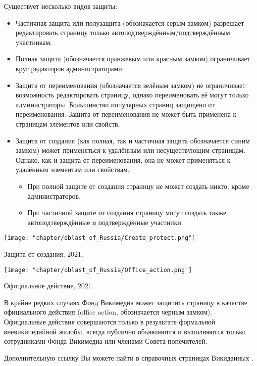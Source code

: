 Существует несколько видов защиты:
\begin{itemize}
  \item Частичная защита или полузащита (обозначается серым замком) разрешает редактировать страницу только автоподтверждённым/подтверждённым участникам.
  \item Полная защита (обозначается оранжевым или красным замком) ограничивает круг редакторов администраторами.
  \item Защита от переименования (обозначается зелёным замком) не ограничивает возможность редактировать страницу, однако переименовать её могут только администраторы. Большинство популярных страниц защищено от переименования. Защита от переименования не может быть применена к страницам элементов или свойств.
  \item Защита от создания (как полная, так и частичная защита обозначается синим замком) может применяться к удалённым или несуществующим страницам. Однако, как и защита от переименования, она не может применяться к удалённым элементам или свойствам.
  \begin{itemize}
	\item При полной защите от создания страницу не может создать никто, кроме администраторов.
	\item При частичной защите от создания страницу могут создать также автоподтверждённые и подтверждённые участники.
  \end{itemize}
\end{itemize}

\begin{marginfigure}[0.0cm]
{
	\setlength{\fboxsep}{0pt}%
	\setlength{\fboxrule}{1pt}%
	{\texttt{[image: "chapter/oblast\_of\_Russia/Create\_protect.png"]}}
}
\caption []{Защита от создания, 2021.}%
\label{fig:legend_population}%
\end{marginfigure}

\begin{marginfigure}[0.0cm]
{
	\setlength{\fboxsep}{0pt}%
	\setlength{\fboxrule}{1pt}%
	{\texttt{[image: "chapter/oblast\_of\_Russia/Office\_action.png"]}}
}
\caption []{Официальное действие, 2021.}%
\label{fig:legend_population}%
\end{marginfigure}

В крайне редких случаях Фонд Викимедиа может защитить страницу в качестве официального действия (office action, обозначается чёрным замком). Официальные действия совершаются только в результате формальной вневикипедийной жалобы, всегда публично объявляются и выполняются только сотрудниками Фонда Викимедиа или членами Совета попечителей.

Дополнительную ссылку Вы можете найти в справочных страницах Викиданных\protect\footnotemark
{}.
